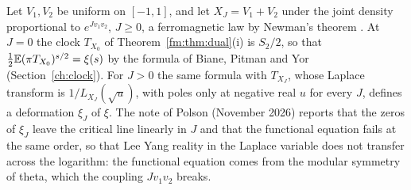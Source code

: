 \begin{remark}[heuristic]\label{fm:rem:williamsj}
Let $V_1,V_2$ be uniform on $[-1,1]$, and let $X_J=V_1+V_2$ under the joint density proportional to $e^{Jv_1v_2}$, $J\ge0$, a ferromagnetic law by Newman's theorem \cite{Newman74}. At $J=0$ the clock $T_{X_0}$ of Theorem~\ref{fm:thm:dual}(i) is $S_2/2$, so that $\frac12\mathbb{E}(\pi T_{X_0})^{s/2}=\xi(s)$ by the formula of Biane, Pitman and Yor (Section~\ref{ch:clock}). For $J>0$ the same formula with $T_{X_J}$, whose Laplace transform is $1/L_{X_J}(\sqrt u)$, with poles only at negative real $u$ for every $J$, defines a deformation $\xi_J$ of $\xi$. The note of Polson (November 2026) reports that the zeros of $\xi_J$ leave the critical line linearly in $J$ and that the functional equation fails at the same order, so that Lee Yang reality in the Laplace variable does not transfer across the logarithm: the functional equation comes from the modular symmetry of theta, which the coupling $Jv_1v_2$ breaks.
\end{remark}
